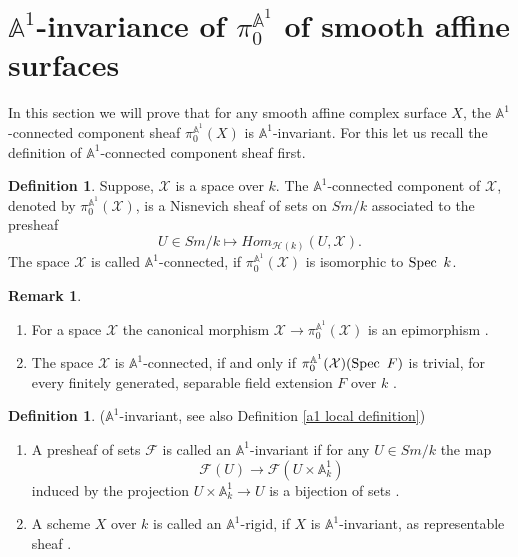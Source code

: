 \documentclass[11pt, reqno]{amsart}
\theoremstyle{plain}
\theoremstyle{definition}
\newtheorem{remark}[thm]{Remark}
\newtheorem{definition}[thm]{Definition}
\newcommand{\Spec}{{\rm Spec \,}}
\newcommand{\sF}{{\mathcal F}}
\newcommand{\sH}{{\mathcal H}}
\newcommand{\sX}{{\mathcal X}}
\newcommand{\sY}{{\mathcal Y}}
\newcommand{\A}{{\mathbb A}}
\begin{document}
	\section{$\A^1$-invariance of $\pi_0^{\A^1}$ of smooth affine surfaces} \label{a1 invariance section}
In this section we will prove that for any smooth affine complex surface $X$, the $\mathbb{A}^1$-connected component sheaf $\pi_0^{\mathbb{A}^1}(X)$ is $\mathbb{A}^1$-invariant. For this let us recall the definition of $\mathbb{A}^1$-connected component sheaf first. 
\begin{definition} \cite[Section 3.2]{mv}
Suppose, $\sX$ is a space over $k$. The $\A^1$-connected component of $\sX$, denoted by $\pi_0^{\A^1}(\sX)$, is a Nisnevich sheaf of sets on $Sm/k$ associated to the presheaf 
$$U \in Sm/k \mapsto Hom_{\sH(k)}(U, \sX).$$
The space $\sX$ is called $\A^1$-connected, if $\pi_0^{\A^1}(\sX)$ is isomorphic to $\Spec\ k$. 
\end{definition}
\begin{remark}
\begin{enumerate}

\item  For a space $\sX$ the canonical morphism $\sX \to \pi_0^{\A^1}(\sX)$ is an epimorphism \cite[Corollary 2.1.5]{am}.
\item The space $\sX$ is $\A^1$-connected, if and only if $\pi_0^{\A^1}(\sX)(\Spec\ F)$ is trivial, for every finitely generated, separable field extension $F$ over $k$ \cite[Lemma 3.3.6]{ictp}.
\end{enumerate}
\end{remark}
\begin{definition}($\A^1$-invariant, see also Definition \ref{a1 local definition}) \label{invariant definition}  \hfill
	\begin{enumerate}
		\item	A presheaf of sets $\sF$ is called an $\A^1$-invariant if for any $U\in Sm/k$ the map
		$$\sF(U)\to \sF(U\times\A^1_k)$$ 
		induced by the projection $U\times\A^1_k \to U$ is a bijection of sets \cite[Definition 1.7]{mor}.
		\item A scheme $X$ over $k$ is called an $\A^1$-rigid, if $X$ is $\A^1$-invariant, as representable sheaf \cite[Example 2.4]{mv}. 
	\end{enumerate}
\end{definition}
\end{document}
